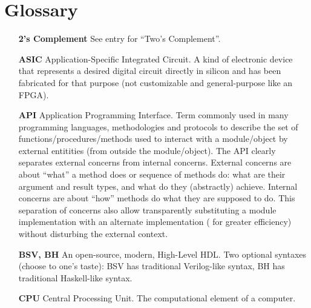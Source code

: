 

\chapter{Glossary}


\setcounter{page}{1}
\renewcommand{\thepage}{\Alph{chapter}-\arabic{page}}

\label{apx_Glossary}


\begin{itemize}

\item[\bf 2's Complement] See entry for ``Two's Complement''.

\item[\bf ASIC] Application-Specific Integrated Circuit. A kind of
  electronic device that represents a desired digital circuit directly
  in silicon and has been fabricated for that purpose (not
  customizable and general-purpose like an FPGA).

\item[\bf API] Application Programming Interface.  Term commonly used
  in many programming languages, methodologies and protocols to
  describe the set of functions/procedures/methods used to interact
  with a module/object by external entitities (from outside the
  module/object).  The API clearly separates external concerns from
  internal concerns.  External concerns are about ``what'' a method
  does or sequence of methods do: what are their argument and result
  types, and what do they (abstractly) achieve.  Internal concerns are
  about ``how'' methods do what they are supposed to do.  This
  separation of concerns also allow transparently substituting a
  module implementation with an alternate implementation ({\eg} for
  greater efficiency) without disturbing the external context.

\item[\bf BSV, BH] An open-source, modern, High-Level HDL.  Two
  optional syntaxes (choose to one's taste): BSV has traditional
  Verilog-like syntax, BH has traditional Haskell-like syntax.

\item[\bf CPU] Central Processing Unit.  The computational element of
  a computer.


\end{itemize}
